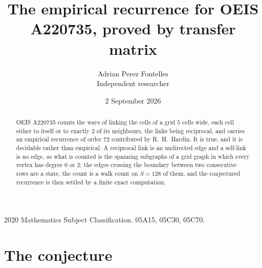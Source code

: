 \documentclass[11pt,a4paper]{article}
\title{The empirical recurrence for OEIS A220735, proved by transfer matrix}
\author{Adrian Perez Fontelles\\ \small Independent researcher}
\date{2 September 2026}
\theoremstyle{plain}
\theoremstyle{definition}
\begin{document}
\maketitle

\begin{abstract}
OEIS A220735 counts the ways of linking the cells of a grid $5$ cells wide, each cell either to
itself or to exactly $2$ of its neighbours, the links being reciprocal, and carries an
empirical recurrence of order $72$ contributed by R.~H.~Hardin. It is true, and it is
decidable rather than empirical. A reciprocal link is an undirected edge and a self-link is
no edge, so what is counted is the spanning subgraphs of a grid graph in which every vertex
has degree $0$ or $2$; the edges crossing the boundary between two consecutive rows are a
state, the count is a walk count on $S=128$ of them, and the conjectured recurrence is then
settled by a finite exact computation.
\end{abstract}

\noindent\small 2020 Mathematics Subject Classification. 05A15, 05C30, 05C70.\normalsize

\section{The conjecture}
\end{document}
